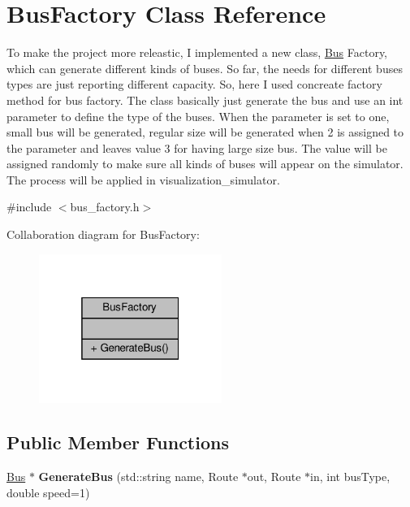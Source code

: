 \hypertarget{classBusFactory}{}\section{Bus\+Factory Class Reference}
\label{classBusFactory}


To make the project more releastic, I implemented a new class, \hyperlink{classBus}{Bus} Factory, which can generate different kinds of buses. So far, the needs for different buses types are just reporting different capacity. So, here I used concreate factory method for bus factory. The class basically just generate the bus and use an int parameter to define the type of the buses. When the parameter is set to one, small bus will be generated, regular size will be generated when 2 is assigned to the parameter and leaves value 3 for having large size bus. The value will be assigned randomly to make sure all kinds of buses will appear on the simulator. The process will be applied in visualization\+\_\+simulator.  




{\ttfamily \#include $<$bus\+\_\+factory.\+h$>$}



Collaboration diagram for Bus\+Factory\+:\nopagebreak
\begin{figure}[H]
\begin{center}
\leavevmode
\includegraphics[width=169pt]{classBusFactory__coll__graph}
\end{center}
\end{figure}
\subsection*{Public Member Functions}
\begin{DoxyCompactItemize}
\item 
\mbox{\label{classBusFactory_a102f9f2e3090f076196e9e1c67ff32ba}} 
\hyperlink{classBus}{Bus} $\ast$ {\bfseries Generate\+Bus} (std\+::string name, Route $\ast$out, Route $\ast$in, int bus\+Type, double speed=1)
\end{DoxyCompactItemize}


